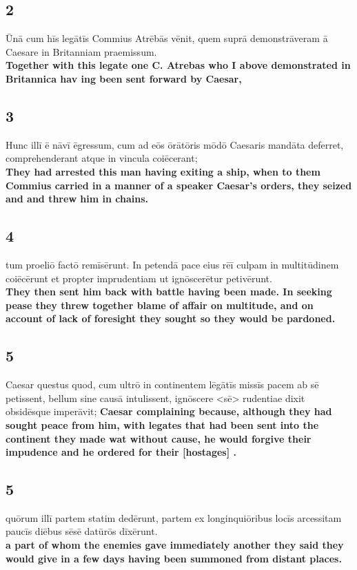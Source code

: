 \documentclass{article}
\begin{document}
\subsection*{2}
Ūnā cum hīs legātīs Commius Atrēbās vēnit, quem suprā demonstrāveram ā Caesare in Britanniam praemissum. \\
\textbf{Together with this legate one C. Atrebas who I above demonstrated in Britannica hav ing been sent forward by Caesar,}

\subsection*{3}
Hunc illī ē nāvī ēgressum, cum ad eōs ōrātōris mōdō Caesaris mandāta deferret, comprehenderant atque in vincula coiēcerant; \\
\textbf{They had arrested this man having exiting a ship, when to them Commius carried in a manner of a speaker Caesar's orders, they seized and and threw him in chains.}

\subsection*{4}
tum proeliō factō remīsērunt. In petendā pace eius rēī culpam in multitūdinem coiēcērunt et propter imprudentiam ut ignōscerētur petivērunt.\\
\textbf{They then sent him back with battle having been made. In seeking pease they threw together blame of affair on multitude, and on account of lack of foresight they sought so they would be pardoned.}

\subsection*{5}
Caesar questus quod, cum ultrō in continentem lēgātīs missīs pacem ab sē petissent, bellum sine causā intulissent, ignōscere <sē> rudentiae dixit obsidēsque imperāvit; 
\textbf{Caesar complaining because, although they had sought peace from him, with legates that had been sent into the continent they made wat without cause, he would forgive their impudence and he ordered for their [hostages] .}

\subsection{5}
quōrum illī partem statim dedērunt, partem ex longinquiōribus locīs arcessitam paucīs diēbus sēsē datūrōs dīxērunt. \\
\textbf{a part of whom the enemies gave immediately another they said they would give in a few days having been summoned from distant places.}
\end{document}
